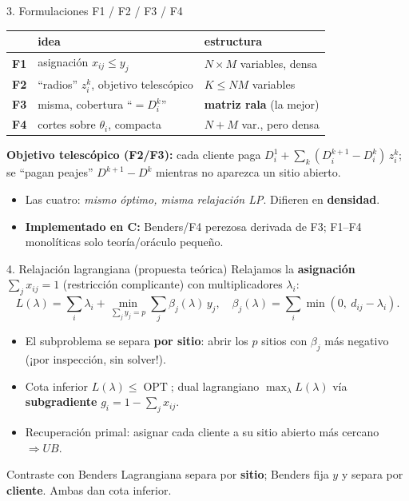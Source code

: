 \documentclass[10pt,aspectratio=169]{beamer}
\DeclareMathOperator*{\OPT}{OPT}
\begin{document}
\begin{frame}{3. Formulaciones F1 / F2 / F3 / F4}
\small
\begin{tabular}{lll}
\toprule
 & idea & estructura \\
\midrule
\textbf{F1} & asignación $x_{ij}\le y_j$ & $N\!\times\!M$ variables, densa \\
\textbf{F2} & ``radios'' $z^k_i$, objetivo telescópico & $K\le NM$ variables \\
\textbf{F3} & misma, cobertura ``$=D^k_i$'' & \textbf{matriz rala} (la mejor) \\
\textbf{F4} & cortes sobre $\theta_i$, compacta & $N\!+\!M$ var., pero densa \\
\bottomrule
\end{tabular}
\vfill
\textbf{Objetivo telescópico (F2/F3):} cada cliente paga $D^1_i + \sum_k (D^{k+1}_i-D^k_i)\,z^k_i$;
se ``pagan peajes'' $D^{k+1}-D^k$ mientras no aparezca un sitio abierto.
\vfill
\begin{itemize}
  \item Las cuatro: \emph{mismo óptimo, misma relajación LP}. Difieren en \textbf{densidad}.
  \item \textbf{Implementado en C:} Benders/F4 perezosa derivada de F3; F1--F4 monolíticas solo teoría/oráculo pequeño.
\end{itemize}
\end{frame}

\begin{frame}{4. Relajación lagrangiana (propuesta teórica)}
Relajamos la \textbf{asignación} $\sum_j x_{ij}=1$ (restricción complicante) con multiplicadores
$\lambda_i$:
\[
  L(\lambda)=\sum_i\lambda_i+\min_{\sum_j y_j=p}\sum_j \beta_j(\lambda)\,y_j,
  \quad \beta_j(\lambda)=\sum_i \min(0,\ d_{ij}-\lambda_i).
\]
\begin{itemize}
  \item El subproblema se separa \textbf{por sitio}: abrir los $p$ sitios con $\beta_j$ más
        negativo (¡por inspección, sin solver!).
  \item Cota inferior $L(\lambda)\le \OPT$; dual lagrangiano $\max_\lambda L(\lambda)$ vía
        \textbf{subgradiente} $g_i=1-\sum_j x_{ij}$.
  \item Recuperación primal: asignar cada cliente a su sitio abierto más cercano $\Rightarrow UB$.
\end{itemize}
\begin{block}{Contraste con Benders}
Lagrangiana separa por \textbf{sitio}; Benders fija $y$ y separa por \textbf{cliente}. Ambas dan
cota inferior.
\end{block}
\end{frame}
\end{document}
